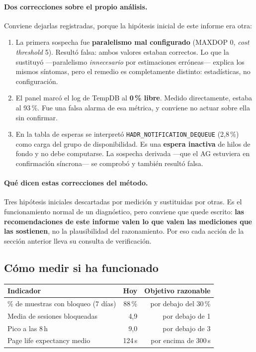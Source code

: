 \documentclass[11pt,a4paper]{article}
\newcommand{\cod}[1]{\texttt{\small #1}}
\begin{document}
\paragraph{Dos correcciones sobre el propio análisis.} Conviene dejarlas
registradas, porque la hipótesis inicial de este informe era otra:

\begin{enumerate}\itemsep2pt
  \item La primera sospecha fue \textbf{paralelismo mal configurado}
        (MAXDOP 0, \emph{cost threshold} 5). Resultó falsa: ambos valores
        estaban correctos. Lo que la sustituyó —paralelismo \emph{innecesario}
        por estimaciones erróneas— explica los mismos síntomas, pero el
        remedio es completamente distinto: estadísticas, no configuración.
  \item El panel marcó el log de TempDB al \textbf{0\,\% libre}. Medido
        directamente, estaba al 93\,\%. Fue una falsa alarma de esa métrica, y
        conviene no actuar sobre ella sin confirmar.
  \item En la tabla de esperas se interpretó
        \cod{HADR\_NOTIFICATION\_DEQUEUE} (2,8\,\%) como carga del grupo de
        disponibilidad. Es una \textbf{espera inactiva} de hilos de fondo y no
        debe computarse. La sospecha derivada —que el AG estuviera en
        confirmación síncrona— se comprobó y también resultó falsa.
\end{enumerate}

\paragraph{Qué dicen estas correcciones del método.} Tres hipótesis iniciales
descartadas por medición y sustituidas por otras. Es el funcionamiento
normal de un diagnóstico, pero conviene que quede escrito: \textbf{las
recomendaciones de este informe valen lo que valen las mediciones que las
sostienen}, no la plausibilidad del razonamiento. Por eso cada acción de la
sección anterior lleva su consulta de verificación.

\subsection{Cómo medir si ha funcionado}

\begin{table}[h]
\centering
\small
\begin{tabular}{lrr}
\toprule
\textbf{Indicador} & \textbf{Hoy} & \textbf{Objetivo razonable} \\
\midrule
\% de muestras con bloqueo (7 días) & 88\,\% & por debajo del 30\,\% \\
Media de sesiones bloqueadas        & 4,9    & por debajo de 1 \\
Pico a las 8\,h                     & 9,0    & por debajo de 3 \\
Page life expectancy medio          & 124\,s & por encima de 300\,s \\
\bottomrule
\end{tabular}
\end{table}
\end{document}
